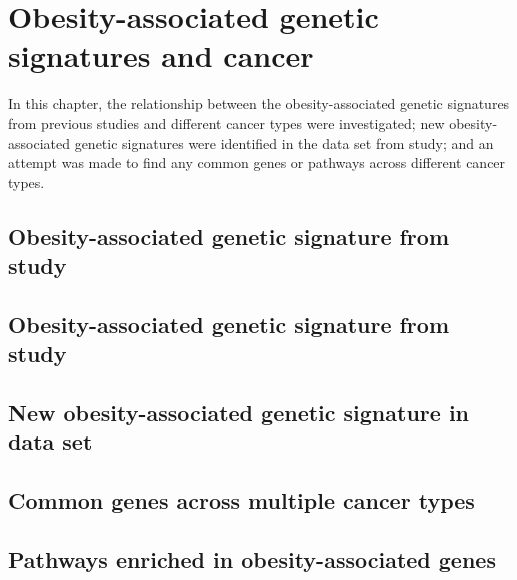\chapter{Obesity-associated genetic signatures and cancer}
\label{cha:obesity_genetic_signatures_and_cancer}

In this chapter, the relationship between the obesity-associated genetic signatures from previous studies and different cancer types were investigated; new obesity-associated genetic signatures were identified in the data set from \citet{Creighton2012} study; and an attempt was made to find any common genes or pathways across different cancer types.


\section{Obesity-associated genetic signature from \citet{Creighton2012} study}
\label{sec:creighton_obesity_metagene}










\section{Obesity-associated genetic signature from \citet{Fuentes-Mattei2014} study}
\label{sec:fm_obesity_metagene}










\section{New obesity-associated genetic signature in \citet{Creighton2012} data set}
\label{sec:creighton_obesity_metagene_new}










\section{Common genes across multiple cancer types}
\label{sec:common_genes_across_multiple_cancer_types}










\section{Pathways enriched in obesity-associated genes}
\label{sec:pathways_enriched_in_obesity_associated_genes}












